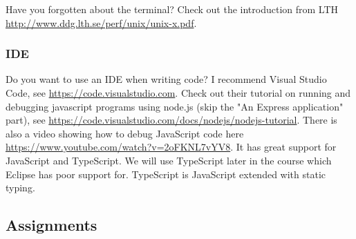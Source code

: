\documentclass[fleqn, article, a4paper]{memoir}
\begin{document}
\noindent Have you forgotten about the terminal? Check out the introduction from LTH \url{http://www.ddg.lth.se/perf/unix/unix-x.pdf}.

\subsubsection*{IDE}

\noindent Do you want to use an IDE when writing code? I recommend Visual Studio Code, see \url{https://code.visualstudio.com}. Check out their tutorial on running and debugging javascript programs using node.js (skip the "An Express application" part), see \url{https://code.visualstudio.com/docs/nodejs/nodejs-tutorial}. There is also a video showing how to debug JavaScript code here \url{https://www.youtube.com/watch?v=2oFKNL7vYV8}. It has great support for JavaScript and TypeScript. We will use TypeScript later in the course which Eclipse has poor support for. TypeScript is JavaScript extended with static typing.

\subsection*{Assignments}
\end{document}
